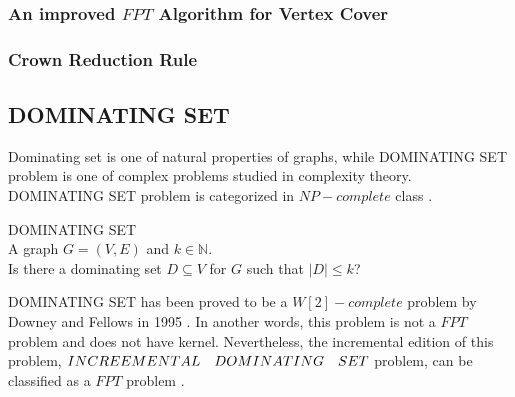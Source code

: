 \subsubsection{An improved ${FPT}$ Algorithm for Vertex Cover} \label{subsubsec:fptvc}
\subsubsection{Crown Reduction Rule} \label{subsubsec:crown}
\subsection{\large{D}\normalsize{OMINATING} \Large{S}\normalsize{ET}} \label{subsec:comds}
Dominating set is one of natural properties of graphs, while \large{D}\normalsize{OMINATING} \Large{S}\normalsize{ET} problem is one of complex problems studied in complexity theory. \large{D}\normalsize{OMINATING} \Large{S}\normalsize{ET} problem is categorized in $NP-complete$ class \cite{garey1979}.
\begin{dproblem}
{\sc \large{D}\normalsize{OMINATING} \Large{S}\normalsize{ET}}\\
\instance A graph $G=(V,E)$ and $k \in \mathds{N}$.\\
\ques Is there a dominating set $D \subseteq V$ for $G$ such that $|D| \leqslant k$?\\
\cite{garey1979}
\end{dproblem}

\vskip -20pt
\large{D}\normalsize{OMINATING} \Large{S}\normalsize{ET} has been proved to be a $W[2]-complete$ problem by Downey and Fellows in 1995 \cite{downey1995}. In another words, this problem is not a $FPT$ problem and does not have kernel. Nevertheless, the incremental edition of this problem, $\large{I}\normalsize{NCREEMENTAL}\quad \large{D}\normalsize{OMINATING}\quad \Large{S}\normalsize{ET}$ problem, can be classified as a $FPT$ problem \cite{downey2014}.
\\
\\
